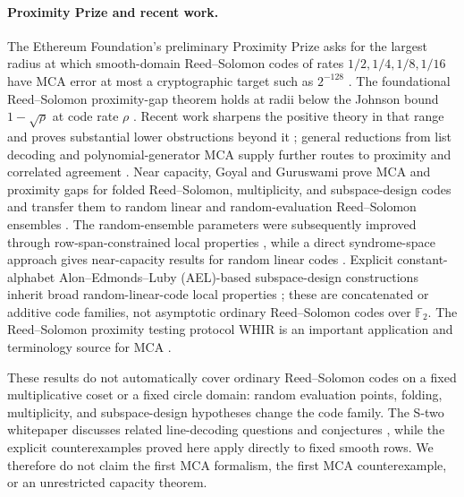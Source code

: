 \documentclass[12pt,a4paper]{amsart}
\numberwithin{equation}{section}
\theoremstyle{remark}
\newcommand{\F}{\mathbb F}
\begin{document}
\paragraph{Proximity Prize and recent work.}
The Ethereum Foundation's preliminary Proximity Prize asks for the
largest radius at which smooth-domain Reed--Solomon codes of rates
\(1/2,1/4,1/8,1/16\) have MCA error at most a cryptographic target such
as \(2^{-128}\) \cite{ProximityPrize,ABF26}.  The foundational
Reed--Solomon proximity-gap theorem holds at radii below the Johnson bound
\(1-\sqrt{\rho}\) at code rate \(\rho\)
\cite{BCIKS20}.  Recent work sharpens the positive theory in that range
and proves substantial lower obstructions beyond it
\cite{BCHKS25,CS25,Habock25}; general reductions from list decoding and
polynomial-generator MCA supply further routes to proximity and
correlated agreement \cite{GaoCaiXuKan25,BordageChiesaGuanManzur25}.
Near capacity, Goyal and Guruswami prove MCA and proximity gaps for
folded Reed--Solomon, multiplicity, and subspace-design codes and transfer
them to random linear and random-evaluation Reed--Solomon ensembles
\cite{GoyalGuruswami25}.  The random-ensemble parameters were subsequently
improved through row-span-constrained local properties
\cite{GoyalGuruswamiSunWootters26}, while a direct syndrome-space approach
gives near-capacity results for random linear codes
\cite{YuanZhu26}.  Explicit constant-alphabet
Alon--Edmonds--Luby (AEL)-based subspace-design constructions inherit
broad random-linear-code local properties
\cite{GoyalGuruswamiHsieh26}; these are concatenated or additive code
families, not asymptotic ordinary Reed--Solomon codes over \(\F_2\).
The Reed--Solomon proximity
testing protocol WHIR is an important application and terminology source
for MCA \cite{WHIR}.

These results do not automatically cover ordinary Reed--Solomon codes on
a fixed multiplicative coset or a fixed circle domain: random evaluation
points, folding, multiplicity, and subspace-design hypotheses change the
code family.  The S-two whitepaper discusses related line-decoding
questions and conjectures \cite{CGHLL26}, while the explicit counterexamples
proved here apply directly to fixed smooth rows.  We therefore
do not claim the first MCA formalism, the first MCA counterexample, or an
unrestricted capacity theorem.
\end{document}
